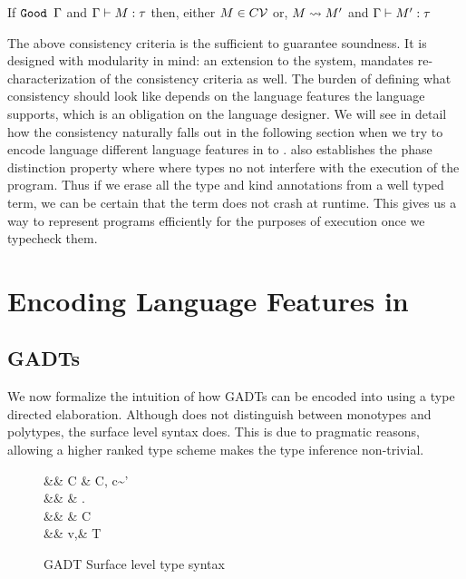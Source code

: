 \documentclass[screen,nonacm]{acmart}
\begin{document}
\begin{theorem}\label{thm:progress-sfc}
 If $\texttt{Good~}\Gamma$ and $\Gamma \vdash M : \tau$ then, either $M \in C\mathcal{V}$ or, $M \rightsquigarrow M'$ and
 $\Gamma \vdash M' : \tau$
\end{theorem}

The above consistency criteria is the sufficient to guarantee soundness. It is designed with modularity in mind: an extension to the system, mandates re-characterization of the consistency criteria as well. The burden of defining what consistency should look like depends on the language features the language supports, which is an obligation on the language designer. We will see in detail how the consistency naturally falls out in the following section when we try to encode language different language features in to \SFC.  also establishes the phase distinction property\cite{harper_higher-order_1989} where where types no not interfere with the execution of the program. Thus if we erase all the type and kind annotations from a well typed term, we can be certain that the term does not crash at runtime. This gives us a way to represent programs efficiently for the purposes of execution once we typecheck them.

\section{Encoding Language Features in \SFC}\label{sec:sfc-encoding-features}%
\subsection{GADTs}\label{sec:fc-encodes-gadts}
We now formalize the intuition of how GADTs can be encoded into \SFC using a type directed elaboration. Although \SFC does not distinguish between monotypes and polytypes, the surface level syntax does. This is due to pragmatic reasons, allowing a higher ranked type scheme makes the type inference non-trivial\cite{jones_practical_2007}.

\begin{figure}[ht]
 \centering
 \begin{syntax}
  && C \bnfeq& \empt \bnfor C, c\co\tau\sim\tau'\\
  && \pi \bnfeq& \eta \bnfor \Forall\TyVar.\pi\\
  && \eta \bnfeq& \tau \bnfor C \then \eta\\
  && v,\tau \bnfeq& \TyVar \bnfor \tau\to\tau \bnfor T\App\many\tau
 \end{syntax}
 \caption{GADT Surface level type syntax}
 \label{fig:gadt-type-syntax}
\end{figure}
\end{document}
